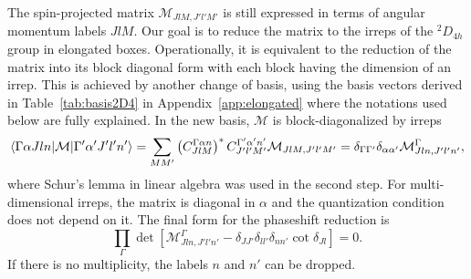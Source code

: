 \documentclass[aps,prd,reprint,showpacs,floatfix,longbibliography,,superscriptaddress]{revtex4-1}
\def\beq{\begin{equation}}
\def\eeq{\end{equation}}
\begin{document}
\begin{widetext}
The spin-projected matrix  $\mathcal{M}_{Jl M,J'l' M' }$ is still expressed in terms of angular momentum labels $Jl M$. 
Our  goal is to reduce the matrix to the irreps of the  $^2D_{4h}$ group in elongated boxes. 
Operationally, it is equivalent to the reduction of the matrix into its block diagonal form with each block having the dimension of an 
irrep.  This is achieved by another change of basis, using the basis vectors derived in Table~\ref{tab:basis2D4} in Appendix~\ref{app:elongated} where the notations used below are fully explained.
In the new basis,  $\mathcal{M}$ is block-diagonalized by irreps
\beq
 \langle \Gamma \alpha J l n |  \mathcal{M} | \Gamma' \alpha' J' l' n'  \rangle \\  =
 \sum_{MM'}  \left (C^{\Gamma \alpha n}_{Jl M}\right )^*  C^{\Gamma' \alpha' n'}_{J'l' M'}  \mathcal{M}_{Jl M,J'l'M' } 
 = \delta_{\Gamma \Gamma'} \delta_{\alpha \alpha'}   \mathcal{M}^\Gamma_{Jl n,J'l' n' },
 \eeq
where Schur's lemma in linear algebra was used in the second step. For multi-dimensional irreps, 
the matrix is diagonal in $\alpha$ and the quantization condition does not depend on it.
The final form for the phaseshift reduction is
\beq
\prod_\Gamma  \det  \left[ \mathcal{M}^\Gamma_{Jl n,J'l' n' }- \delta_{JJ'}  \delta_{ll'}  \delta_{nn'} \cot \delta_{Jl} \right ]=0.
\label{eq:phaselat3}
\eeq
If there is no multiplicity, the labels $n$ and $n'$ can be dropped.


\end{widetext}
\end{document}
